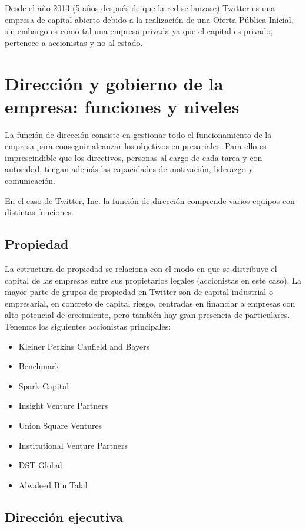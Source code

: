 Desde el año 2013 (5 años después de que la red se lanzase) Twitter es una empresa de capital abierto debido a la realización de una Oferta Pública Inicial, sin embargo es como tal una empresa privada ya que el capital es privado, pertenece a accionistas y no al estado.

\section{Dirección y gobierno de la empresa: funciones y niveles}

La función de dirección consiste en gestionar todo el funcionamiento de la empresa para conseguir alcanzar los objetivos empresariales. Para ello es imprescindible que los directivos, personas al cargo de cada tarea y con autoridad, tengan además las capacidades de motivación, liderazgo y comunicación.

En el caso de Twitter, Inc. la función de dirección comprende varios equipos con distintas funciones.

\subsection{Propiedad}

La estructura de propiedad se relaciona con el modo en que se distribuye el capital de las empresas entre sus propietarios legales (accionistas en este caso). La mayor parte de grupos de propiedad en Twitter son de capital industrial o empresarial, en concreto de capital riesgo, centradas en financiar a empresas con alto potencial de crecimiento, pero también hay gran presencia de particulares. Tenemos los siguientes accionistas principales:

\begin{itemize}

\item Kleiner Perkins Caufield and Bayers
\item Benchmark
\item Spark Capital
\item Insight Venture Partners
\item Union Square Ventures
\item Institutional Venture Partners
\item DST Global
\item Alwaleed Bin Talal

\end{itemize}

\subsection{Dirección ejecutiva}

